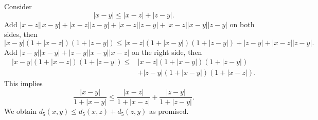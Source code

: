 \begin{Exercise}
\begin{solution}
\begin{itemize}
Consider
$$
|x-y| \leq |x-z| + |z-y|.
$$
Add $|x-z| |x-y| + |x-z| |z-y| + |x-z| |z-y| + |x-z| |x-y| |z-y|$ on both sides, then
$$
|x-y|(1+|x-z|)(1+|z-y|) \leq |x-z|(1+|x-y|)(1+|z-y|) + |z-y| + |x-z| |z-y|.
$$
Add $|z-y| |x-y| + |z-y| |x-y| |x-z|$ on the right side, then
\begin{align*}
|x-y|(1+|x-z|)(1+|z-y|) 
\leq& |x-z|(1+|x-y|)(1+|z-y|) \\
\quad& +|z-y|(1+|x-y|)(1+|x-z|).
\end{align*}
This implies
$$
\frac{|x-y|}{1+|x-y|} \leq \frac{|x-z|}{1+|x-z|} + \frac{|z-y|}{1+|z-y|}.
$$
We obtain $d_5(x,y) \leq d_5(x,z) + d_5(z,y)$ as promised.
\end{itemize}
\end{solution}
\end{Exercise}